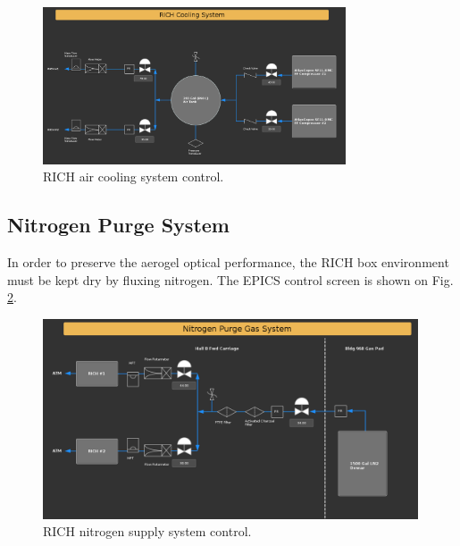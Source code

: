 \documentclass[12pt]{article}
\begin{document}
\begin{figure}[htbp]
\center
\includegraphics[width=0.80\textwidth]{Justin_plots/GasCooling.PNG}
\caption{ \label{AIR_gas} RICH air cooling system control.}
\end{figure}


\subsection{Nitrogen Purge System}

In order to preserve the aerogel optical performance, the RICH box environment must be kept dry by fluxing nitrogen.
The EPICS control screen is shown on Fig. \ref{fig:N2_drawing}.


\begin{figure}[h!]
\center
\includegraphics[width=0.99\textwidth]{Justin_plots/N2Purge.PNG}
\caption{ \label{fig:N2_drawing} RICH  nitrogen supply system control.}
\end{figure}
\end{document}

